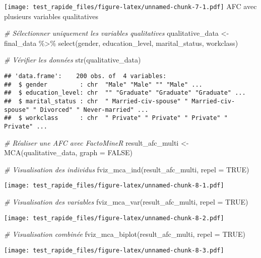 \documentclass[
]{article}
\newenvironment{Shaded}{\begin{snugshade}}{\end{snugshade}}
\newcommand{\AttributeTok}[1]{\textcolor[rgb]{0.77,0.63,0.00}{#1}}
\newcommand{\CommentTok}[1]{\textcolor[rgb]{0.56,0.35,0.01}{\textit{#1}}}
\newcommand{\ConstantTok}[1]{\textcolor[rgb]{0.00,0.00,0.00}{#1}}
\newcommand{\FunctionTok}[1]{\textcolor[rgb]{0.00,0.00,0.00}{#1}}
\newcommand{\NormalTok}[1]{#1}
\newcommand{\OtherTok}[1]{\textcolor[rgb]{0.56,0.35,0.01}{#1}}
\newcommand{\SpecialCharTok}[1]{\textcolor[rgb]{0.00,0.00,0.00}{#1}}
\begin{document}
\texttt{[image: test\_rapide\_files/figure-latex/unnamed-chunk-7-1.pdf]}
AFC avec plusieurs variables qualitatives

\begin{Shaded}
\begin{Highlighting}[]
\CommentTok{\# Sélectionner uniquement les variables qualitatives}
\NormalTok{qualitative\_data }\OtherTok{\textless{}{-}}\NormalTok{ final\_data }\SpecialCharTok{\%\textgreater{}\%}
  \FunctionTok{select}\NormalTok{(gender, education\_level, marital\_status, workclass)}

\CommentTok{\# Vérifier les données}
\FunctionTok{str}\NormalTok{(qualitative\_data)}
\end{Highlighting}
\end{Shaded}

\begin{verbatim}
## 'data.frame':    200 obs. of  4 variables:
##  $ gender         : chr  "Male" "Male" "" "Male" ...
##  $ education_level: chr  "" "Graduate" "Graduate" "Graduate" ...
##  $ marital_status : chr  " Married-civ-spouse" " Married-civ-spouse" " Divorced" " Never-married" ...
##  $ workclass      : chr  " Private" " Private" " Private" " Private" ...
\end{verbatim}

\begin{Shaded}
\begin{Highlighting}[]
\CommentTok{\# Réaliser une AFC avec FactoMineR}
\NormalTok{result\_afc\_multi }\OtherTok{\textless{}{-}} \FunctionTok{MCA}\NormalTok{(qualitative\_data, }\AttributeTok{graph =} \ConstantTok{FALSE}\NormalTok{)}

\CommentTok{\# Visualisation des individus}
\FunctionTok{fviz\_mca\_ind}\NormalTok{(result\_afc\_multi, }\AttributeTok{repel =} \ConstantTok{TRUE}\NormalTok{)}
\end{Highlighting}
\end{Shaded}

\texttt{[image: test\_rapide\_files/figure-latex/unnamed-chunk-8-1.pdf]}

\begin{Shaded}
\begin{Highlighting}[]
\CommentTok{\# Visualisation des variables}
\FunctionTok{fviz\_mca\_var}\NormalTok{(result\_afc\_multi, }\AttributeTok{repel =} \ConstantTok{TRUE}\NormalTok{)}
\end{Highlighting}
\end{Shaded}

\texttt{[image: test\_rapide\_files/figure-latex/unnamed-chunk-8-2.pdf]}

\begin{Shaded}
\begin{Highlighting}[]
\CommentTok{\# Visualisation combinée}
\FunctionTok{fviz\_mca\_biplot}\NormalTok{(result\_afc\_multi, }\AttributeTok{repel =} \ConstantTok{TRUE}\NormalTok{)}
\end{Highlighting}
\end{Shaded}

\texttt{[image: test\_rapide\_files/figure-latex/unnamed-chunk-8-3.pdf]}
\end{document}
